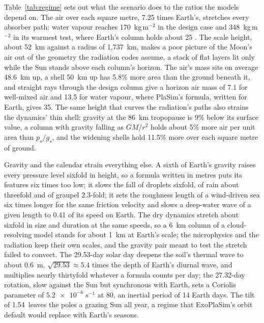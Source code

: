 Table~\ref{tab:regime} sets out what the scenario does to the ratios the models depend on. The air over
each square metre, 7.25 times Earth's, stretches every absorber path: water vapour reaches
170~kg\,m$^{-2}$ in the design case and 348~kg\,m$^{-2}$ in its warmest test, where Earth's column holds
about 25 \autocite{trenberth2005trends}. The scale height, about 52~km against a radius of
1,737~km, makes a poor picture of the Moon's air out of the geometry the radiation codes assume, a stack of
flat layers lit only while the Sun stands above each column's horizon. The air's mass sits on average
48.6~km up, a shell 50~km up has 5.8\% more area than the ground beneath it, and straight rays through the
design column give a horizon air mass of 7.1 for well-mixed air and 13.5 for water vapour, where PlaSim's
formula, written for Earth, gives 35. The same height that curves the radiation's paths also
strains the dynamics' thin shell: gravity at the 86~km tropopause is 9\% below its surface value, a column
with gravity falling as $GM/r^2$ holds about 5\% more air per unit area than $p_s/g_s$, and the widening
shells hold 11.5\% more over each square metre of ground.

Gravity and the calendar strain everything else. A sixth of Earth's gravity raises every pressure level
sixfold in height, so a formula written in metres puts its features six times too low; it slows the fall
of droplets sixfold, of rain about threefold and of graupel 2.3-fold; it sets the roughness length of a
wind-driven sea six times longer for the same friction velocity \autocite{charnock1955wind} and slows a
deep-water wave of a given length to 0.41 of its speed on Earth. The dry dynamics stretch about
sixfold in size and duration at the same speeds, so a 6~km column of a cloud-resolving model stands for
about 1~km at Earth's scale; the microphysics and the radiation keep their own scales, and the gravity pair
meant to test the stretch failed to convect. The 29.53-day solar day deepens the soil's thermal
wave to about 0.6~m, $\sqrt{29.53}\approx5.4$ times the depth of Earth's diurnal wave, and multiplies nearly
thirtyfold whatever a formula counts per day; the 27.32-day rotation, slow against the Sun but synchronous
with Earth, sets a Coriolis parameter of $\SI{5.2e-6}{s^{-1}}$ at 80\textdegree, an inertial period of
14 Earth days. The tilt of 1.54\textdegree\ leaves the poles a grazing Sun all year, a regime
that ExoPlaSim's orbit default would replace with Earth's seasons.

